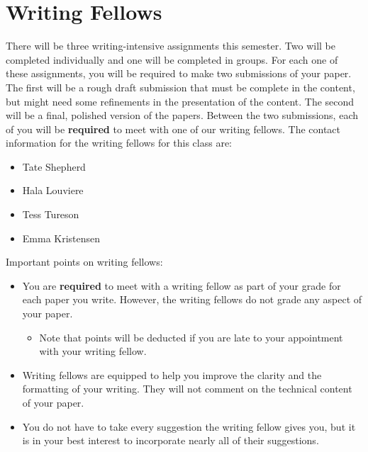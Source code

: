 \documentclass[12pt]{notes}
\begin{document}

\section{Writing Fellows}
There will be three writing-intensive assignments this semester. Two will be completed individually and one will be completed in groups. For each one of these assignments, you will be required to make two submissions of your paper. The first will be a rough draft submission that must be complete in the content, but might need some refinements in the presentation of the content. The second will be a final, polished version of the papers. Between the two submissions, each of you will be \textbf{required} to meet with one of our writing fellows. The contact information for the writing fellows for this class are:

\begin{itemize}
\item Tate Shepherd
\item Hala Louviere
\item Tess Tureson
\item Emma Kristensen
\end{itemize}

\nspace
Important points on writing fellows:
\begin{itemize}
\item You are \textbf{required} to meet with a writing fellow as part of your grade for each paper you write. However, the writing fellows do not grade any aspect of your paper. 
\begin{itemize}
\item Note that points will be deducted if you are late to your appointment with your writing fellow. 
\end{itemize}
\item Writing fellows are equipped to help you improve the clarity and the formatting of your writing. They will not comment on the technical content of your paper. 
\item You do not have to take every suggestion the writing fellow gives you, but it is in your best interest to incorporate nearly all of their suggestions. 
\end{itemize}

\end{document}
